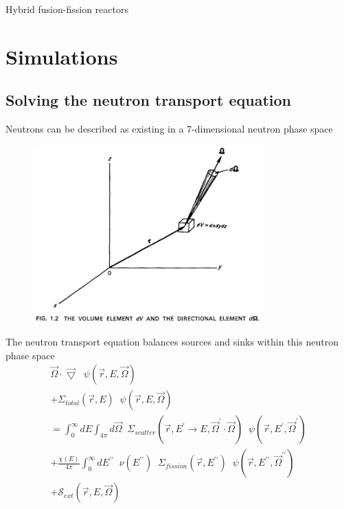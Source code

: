 \documentclass{beamer}
\begin{document}
    \begin{frame}{Hybrid fusion-fission reactors}
    \end{frame}

\section{Simulations}

\subsection{Solving the neutron transport equation}

    \begin{frame}{Neutrons can be described as existing in a 7-dimensional neutron phase space}
        \begin{figure}
            \centering
            \includegraphics[width=24em]{./img/phaseSpace.png}
        \end{figure}
    \end{frame}

    \begin{frame}{The neutron transport equation balances sources and sinks within this neutron phase space}
        \begin{equation*}
            \begin{split}
                \vec \Omega \cdot \vec \bigtriangledown \; \; \psi(\vec r, E, \vec \Omega) \\
                + \Sigma_{total}(\vec r, E) \; \; \psi(\vec r, E, \vec\Omega) \\
                = \int_0^\infty \! \! \! \! dE \int_{4\pi} \! \! \! \! d\vec\Omega \; \; \Sigma_{scatter}(\vec r, E^\prime \rightarrow E, \vec \Omega^\prime \cdot \vec \Omega) \; \; \psi(\vec r, E^\prime, \vec\Omega^\prime) \\
                + \frac{\chi(E)}{4\pi} \int_0^\infty \! \! \! \! dE^{\prime\prime} \; \; \nu (E^{\prime\prime}) \; \; \Sigma_{fission}(\vec r, E^{\prime\prime}) \; \; \psi(\vec r, E^{\prime\prime}, \vec\Omega^{\prime\prime}) \\
                + \mathcal{S}_{ext}(\vec r, E, \vec\Omega)
            \end{split}
        \end{equation*}
    \end{frame}
\end{document}
